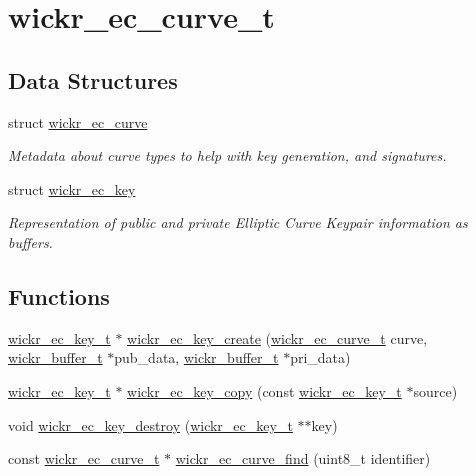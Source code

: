 \hypertarget{group__wickr__ec__curve}{}\section{wickr\+\_\+ec\+\_\+curve\+\_\+t}
\label{group__wickr__ec__curve}
\subsection*{Data Structures}
\begin{DoxyCompactItemize}
\item 
struct \mbox{\hyperlink{structwickr__ec__curve}{wickr\+\_\+ec\+\_\+curve}}
\begin{DoxyCompactList}\small\item\em Metadata about curve types to help with key generation, and signatures. \end{DoxyCompactList}\item 
struct \mbox{\hyperlink{structwickr__ec__key}{wickr\+\_\+ec\+\_\+key}}
\begin{DoxyCompactList}\small\item\em Representation of public and private Elliptic Curve Keypair information as buffers. \end{DoxyCompactList}\end{DoxyCompactItemize}
\subsection*{Functions}
\begin{DoxyCompactItemize}
\item 
\mbox{\hyperlink{structwickr__ec__key}{wickr\+\_\+ec\+\_\+key\+\_\+t}} $\ast$ \mbox{\hyperlink{group__wickr__ec__curve_ga912f46bc12a39f57d8d1b87a639f7cdf}{wickr\+\_\+ec\+\_\+key\+\_\+create}} (\mbox{\hyperlink{structwickr__ec__curve}{wickr\+\_\+ec\+\_\+curve\+\_\+t}} curve, \mbox{\hyperlink{structwickr__buffer}{wickr\+\_\+buffer\+\_\+t}} $\ast$pub\+\_\+data, \mbox{\hyperlink{structwickr__buffer}{wickr\+\_\+buffer\+\_\+t}} $\ast$pri\+\_\+data)
\item 
\mbox{\hyperlink{structwickr__ec__key}{wickr\+\_\+ec\+\_\+key\+\_\+t}} $\ast$ \mbox{\hyperlink{group__wickr__ec__curve_gaf12eff11d78b2ce9ff32710406d58d4f}{wickr\+\_\+ec\+\_\+key\+\_\+copy}} (const \mbox{\hyperlink{structwickr__ec__key}{wickr\+\_\+ec\+\_\+key\+\_\+t}} $\ast$source)
\item 
void \mbox{\hyperlink{group__wickr__ec__curve_gac18ac86b270f540bf5a55ad271ab0568}{wickr\+\_\+ec\+\_\+key\+\_\+destroy}} (\mbox{\hyperlink{structwickr__ec__key}{wickr\+\_\+ec\+\_\+key\+\_\+t}} $\ast$$\ast$key)
\item 
const \mbox{\hyperlink{structwickr__ec__curve}{wickr\+\_\+ec\+\_\+curve\+\_\+t}} $\ast$ \mbox{\hyperlink{group__wickr__ec__curve_ga35d0968431b69993b7a6e3351d503d72}{wickr\+\_\+ec\+\_\+curve\+\_\+find}} (uint8\+\_\+t identifier)
\end{DoxyCompactItemize}


